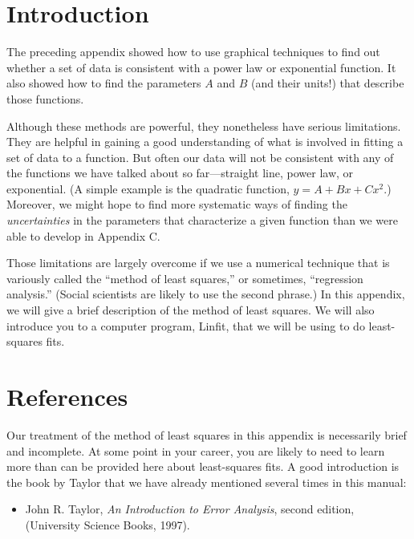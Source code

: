 \newapp
\label{compassis}

\section*{Introduction}

The preceding appendix showed how to use graphical techniques to find
out whether a set of data is consistent with a power law or
exponential function.  It also showed how to find the parameters $A$
and $B$ (and their units!) that describe those functions.

Although these methods are powerful, they nonetheless have serious
limitations.  They are helpful in gaining
a good understanding of what is involved in fitting a set of data to a
function.  But often our data will not be consistent with any of the
functions we have talked about so far---straight line, power law, or
exponential.  (A simple example is the quadratic function, $y = A
+ B x + C x^2$.)  Moreover, we might hope to find more systematic ways
of
finding the {\em uncertainties} in the parameters that characterize a
given function than we were able to develop in Appendix C.

Those limitations are largely overcome if we use a numerical technique
that is variously called the ``method of least squares,'' or
sometimes, ``regression analysis.''  (Social scientists are likely to
use the second phrase.)  In this appendix, we will give a brief
description of the method of least squares.  We will also introduce
you to a computer program, Linfit, that we will be using to do
least-squares fits.

\section*{References}

Our treatment of the method of least squares in this appendix is
necessarily brief and incomplete.  At some point in your career, you
are likely to need to learn more
than can be provided here about least-squares fits.  
A good introduction is the book by
Taylor that we have already mentioned several times in this manual:

\begin{itemize}
   \item     John R.  Taylor, {\em An Introduction
to Error Analysis}, second edition, (University Science Books, 1997).
\end{itemize}


